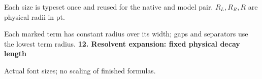 \documentclass{article}
\newcommand\Mark[1]{\directlua{grid.mark(#1)}}
\begin{document}
\par\medskip
Each size is typeset once and reused for the native and model pair. $R_L,R_R,R$ are physical radii in pt.\par
Each marked term has constant radius over its width; gaps and separators use the lowest term radius.
\newpage
{\Large\bfseries 12. Resolvent expansion: fixed physical decay length}\par\medskip
{} Actual font sizes; no scaling of finished formulas.\par\medskip
\end{document}
